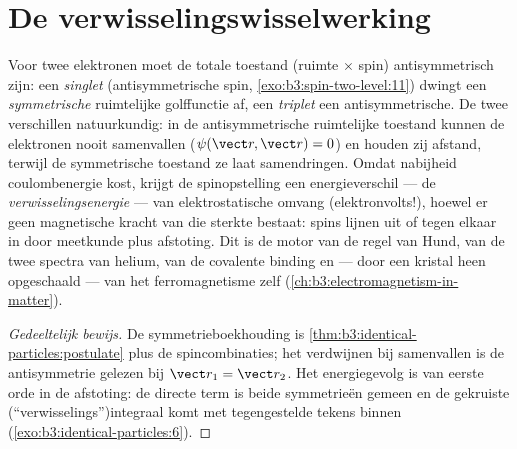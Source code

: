 \section{De verwisselingswisselwerking}

\begin{proposition}\label{prop:b3:identical-particles:exchange-force}
Voor twee elektronen moet de totale toestand (ruimte $\times$ spin)
antisymmetrisch zijn: een \emph{singlet} (antisymmetrische spin,
\cref{exo:b3:spin-two-level:11}) dwingt een \emph{symmetrische}
ruimtelijke golffunctie af, een \emph{triplet} een antisymmetrische. De
twee verschillen natuurkundig: in de antisymmetrische ruimtelijke
toestand kunnen de elektronen nooit samenvallen ($\psi(\vect r, \vect r) = 0$) en houden zij afstand, terwijl de symmetrische toestand ze laat
samendringen. Omdat nabijheid coulombenergie kost, krijgt de
spinopstelling een energieverschil --- de \emph{verwisselingsenergie} ---
van elektrostatische omvang (elektronvolts!), hoewel er geen magnetische
kracht van die sterkte bestaat: spins lijnen uit of tegen elkaar in door
meetkunde plus afstoting. Dit is de motor van de regel van Hund, van de
twee spectra van helium, van de covalente binding en --- door een kristal
heen opgeschaald --- van het ferromagnetisme zelf
(\cref{ch:b3:electromagnetism-in-matter}).
\end{proposition}

\begin{proof}[Gedeeltelijk bewijs]
De symmetrieboekhouding is
\cref{thm:b3:identical-particles:postulate} plus de spincombinaties; het
verdwijnen bij samenvallen is de antisymmetrie gelezen bij $\vect r_1 = \vect r_2$. Het energiegevolg is  van eerste orde in de
afstoting: de directe term is beide symmetrieën gemeen en de gekruiste
(``verwisselings'')integraal komt met tegengestelde tekens binnen
(\cref{exo:b3:identical-particles:6}).
\end{proof}

